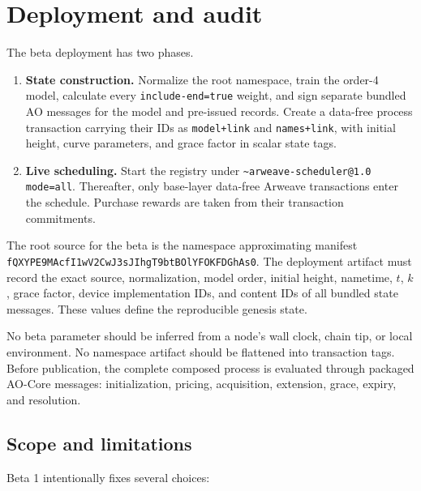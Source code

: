 \documentclass[10pt,twocolumn]{article}
\newcommand{\device}[1]{\texttt{\textasciitilde#1}}
\newcommand{\key}[1]{\texttt{#1}}
\begin{document}
\section{Deployment and audit}\label{sec:deployment}

The beta deployment has two phases.

\begin{enumerate}
  \item \textbf{State construction.} Normalize the root namespace, train the
        order-4 model, calculate every \key{include-end=true} weight, and sign
        separate bundled AO messages for the model and pre-issued records.
        Create a data-free process transaction carrying their IDs as
        \key{model+link} and \key{names+link}, with initial height, curve
        parameters, and grace factor in scalar state tags.
  \item \textbf{Live scheduling.} Start the registry under
        \device{arweave-scheduler@1.0} \key{mode=all}. Thereafter, only
        base-layer data-free Arweave transactions enter the schedule. Purchase
        rewards are taken from their transaction commitments.
\end{enumerate}

The root source for the beta is the namespace approximating manifest\\
\key{fQXYPE9MAcfI1wV2CwJ3sJIhgT9btBOlYFOKFDGhAs0}. The deployment artifact must
record the exact source, normalization, model order, initial height, nametime,
$t$, $k$, grace factor, device implementation IDs, and content IDs of all
bundled state messages. These values define the reproducible genesis state.

No beta parameter should be inferred from a node's wall clock, chain tip, or
local environment. No namespace artifact should be flattened into transaction
tags. Before publication, the complete composed process is evaluated through
packaged AO-Core messages: initialization, pricing, acquisition, extension,
grace, expiry, and resolution.

\subsection{Scope and limitations}

Beta 1 intentionally fixes several choices:
\end{document}
